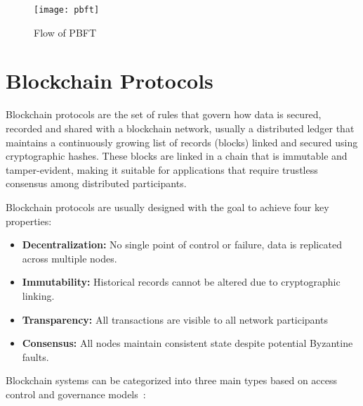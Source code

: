 \begin{figure}[h]
	\centering
	\texttt{[image: pbft]}
	\caption{Flow of PBFT}
	\label{fig:pbft}
\end{figure}

\section{Blockchain Protocols}\label{sec:blockchain}

Blockchain protocols are the set of rules that govern how data is secured, recorded and shared
with a blockchain network, usually a distributed ledger that maintains a continuously
growing list of records (blocks) linked and secured using cryptographic hashes. These blocks
are linked in a chain that is immutable and tamper-evident, making it suitable for applications
that require trustless consensus among distributed participants.

Blockchain protocols are usually designed with the goal to achieve four key properties:
\begin{itemize}
  \item \textbf{Decentralization:} No single point of control or failure, data is replicated across multiple nodes.
  \item \textbf{Immutability:} Historical records cannot be altered due to cryptographic linking.
  \item \textbf{Transparency:} All transactions are visible to all network participants
  \item \textbf{Consensus:} All nodes maintain consistent state despite potential Byzantine faults.
\end{itemize}

Blockchain systems can be categorized into three main types based on access control and
governance models~\cite{blockchain_consensus}:

